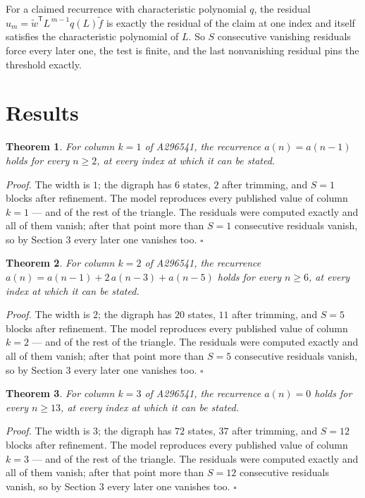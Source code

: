 \documentclass[11pt]{article}
\newtheorem{theorem}{Theorem}
\theoremstyle{definition}
\begin{document}
For a claimed recurrence with characteristic polynomial $q$, the residual $u_m = \tilde w^{\mathsf T}L^{\,m-1}q(L)\tilde f$ is exactly the residual of the claim at one index and itself satisfies the characteristic polynomial of $L$. So $S$ consecutive vanishing residuals force every later one, the test is finite, and the last nonvanishing residual pins the threshold exactly.

\section{Results}

\begin{theorem} For column $k = 1$ of A296541, the recurrence $a(n) = a(n-1)$ holds for every $n \ge 2$, at every index at which it can be stated.\end{theorem}

{\itshape Proof.} The width is $1$; the digraph has $6$ states, $2$ after trimming, and $S = 1$ blocks after refinement. The model reproduces every published value of column $k = 1$ --- and of the rest of the triangle. The residuals were computed exactly and all of them vanish; after that point more than $S = 1$ consecutive residuals vanish, so by Section 3 every later one vanishes too. $\square$

\begin{theorem} For column $k = 2$ of A296541, the recurrence $a(n) = a(n-1) + 2\,a(n-3) + a(n-5)$ holds for every $n \ge 6$, at every index at which it can be stated.\end{theorem}

{\itshape Proof.} The width is $2$; the digraph has $20$ states, $11$ after trimming, and $S = 5$ blocks after refinement. The model reproduces every published value of column $k = 2$ --- and of the rest of the triangle. The residuals were computed exactly and all of them vanish; after that point more than $S = 5$ consecutive residuals vanish, so by Section 3 every later one vanishes too. $\square$

\begin{theorem} For column $k = 3$ of A296541, the recurrence $a(n) = 0$ holds for every $n \ge 13$, at every index at which it can be stated.\end{theorem}

{\itshape Proof.} The width is $3$; the digraph has $72$ states, $37$ after trimming, and $S = 12$ blocks after refinement. The model reproduces every published value of column $k = 3$ --- and of the rest of the triangle. The residuals were computed exactly and all of them vanish; after that point more than $S = 12$ consecutive residuals vanish, so by Section 3 every later one vanishes too. $\square$
\end{document}
